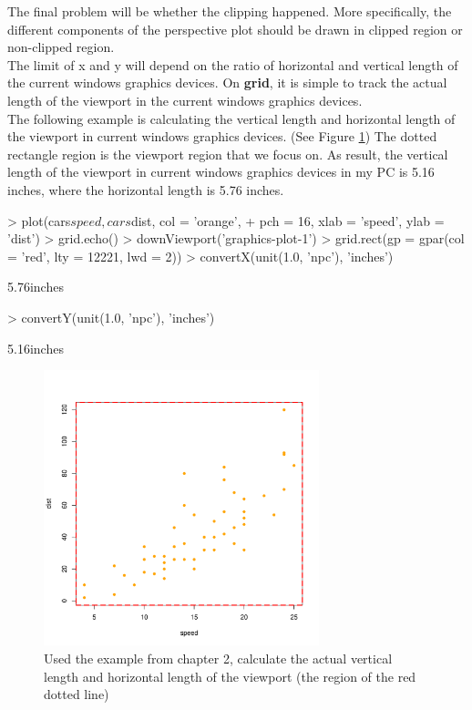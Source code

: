 \documentclass[11pt,twoside]{report}
\begin{document}
The final problem will be whether the clipping happened. More specifically, the different components of the perspective plot should be drawn in clipped region or non-clipped region.\\

The limit of x and y will depend on the ratio of horizontal and vertical length of the current windows graphics devices. On \textbf{grid}, it is simple to track the actual length of the viewport in the current windows graphics devices. \\

The following example is calculating the vertical length and horizontal length of the viewport in current windows graphics devices. (See Figure \ref{figure_4.2}) The dotted rectangle region is the viewport region that we focus on. As result, the vertical length of the viewport in current windows graphics devices in my PC is 5.16 inches, where the horizontal length is 5.76 inches. 
\begin{Schunk}
\begin{Sinput}
> plot(cars$speed, cars$dist, col = 'orange', 
+       pch = 16, xlab = 'speed', ylab = 'dist')
> grid.echo()
> downViewport('graphics-plot-1')
> grid.rect(gp = gpar(col = 'red', lty = 12221, lwd = 2))
> convertX(unit(1.0, 'npc'), 'inches')
\end{Sinput}
\begin{Soutput}
[1] 5.76inches
\end{Soutput}
\begin{Sinput}
> convertY(unit(1.0, 'npc'), 'inches')
\end{Sinput}
\begin{Soutput}
[1] 5.16inches
\end{Soutput}
\end{Schunk}

\begin{figure}[h]
	\begin{center}
		\includegraphics[height = 8cm, width = 8cm]{figure/gridGraphics_persp_demo_1.pdf}
		\caption{Used the example from chapter 2, calculate the actual vertical length and horizontal length of the viewport (the region of the red dotted line)}
		\label{figure_4.2}
	\end{center}
\end{figure}
\end{document}
